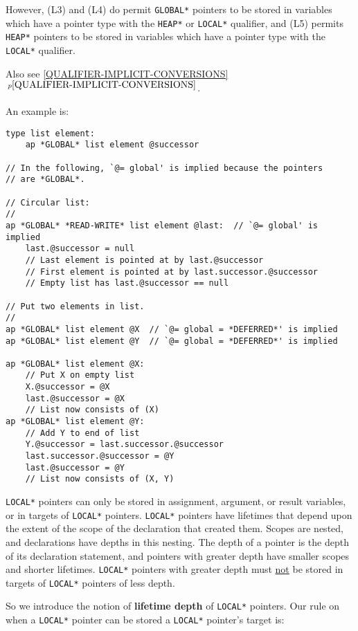 \documentclass[12pt]{article}
\newcommand{\key}[1]{{\rm \bfseries #1}}
\newcommand{\itemref}[1]{\ref{#1}$\,^{p\pageref{#1}}$}
\newenvironment{indpar}[1][0.3in]%
	{\begin{list}{}%
		     {\setlength{\itemsep}{0in}%
		      \setlength{\topsep}{0in}%
		      \setlength{\parsep}{1ex}%
		      \setlength{\labelwidth}{#1}%
		      \setlength{\leftmargin}{#1}%
		      \addtolength{\leftmargin}{\labelsep}}%
	 \item}%
	{\end{list}}
\begin{document}
\begin{indpar}[0.2in]
However, (L3) and (L4) do permit {\tt *GLOBAL*} pointers to be stored in
variables which have a pointer type with the {\tt *HEAP*} or {\tt *LOCAL*}
qualifier, and (L5) permits {\tt *HEAP*} pointers to be stored in
variables which have a pointer type with the {\tt *LOCAL*} qualifier.

Also see \itemref{QUALIFIER-IMPLICIT-CONVERSIONS}.
\end{indpar}

An example is:
\begin{indpar}\begin{verbatim}
type list element:
    ap *GLOBAL* list element @successor

// In the following, `@= global' is implied because the pointers
// are *GLOBAL*.

// Circular list:
//
ap *GLOBAL* *READ-WRITE* list element @last:  // `@= global' is implied
    last.@successor = null
    // Last element is pointed at by last.@successor
    // First element is pointed at by last.successor.@successor
    // Empty list has last.@successor == null

// Put two elements in list.
//
ap *GLOBAL* list element @X  // `@= global = *DEFERRED*' is implied
ap *GLOBAL* list element @Y  // `@= global = *DEFERRED*' is implied

ap *GLOBAL* list element @X:
    // Put X on empty list
    X.@successor = @X
    last.@successor = @X
    // List now consists of (X)
ap *GLOBAL* list element @Y:
    // Add Y to end of list
    Y.@successor = last.successor.@successor 
    last.successor.@successor = @Y
    last.@successor = @Y
    // List now consists of (X, Y)
\end{verbatim}\end{indpar}

{\tt *LOCAL*} pointers can only be stored in assignment, argument,
or result variables, or in targets of {\tt *LOCAL*} pointers.
{\tt *LOCAL*} pointers have lifetimes that depend upon the
extent of the scope of the declaration that created them.
Scopes are nested, and declarations have depths in this nesting.
The depth of a pointer is the depth of its declaration statement,
and pointers with greater depth have smaller scopes and shorter
lifetimes.
{\tt *LOCAL*} pointers with greater depth must
\underline{not} be stored in targets of {\tt *LOCAL*} pointers of less depth.

So we introduce the notion of \key{lifetime depth} of {\tt *LOCAL*} pointers.
Our rule on when a {\tt *LOCAL*} pointer
can be stored a {\tt *LOCAL*} pointer's target is:
\end{document}
